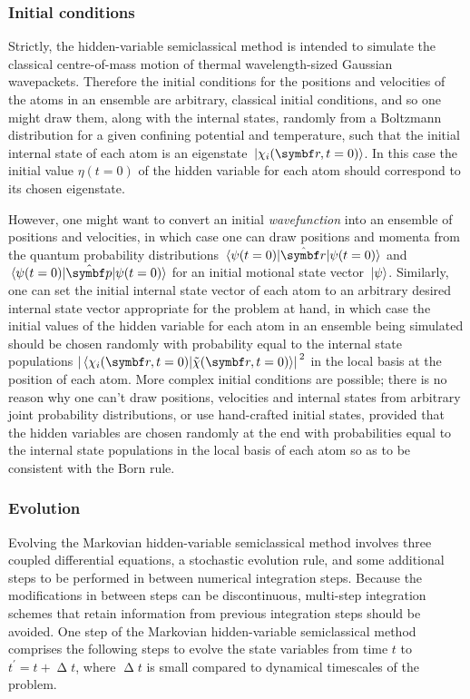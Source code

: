 \subsubsection{Initial conditions}

Strictly, the hidden-variable semiclassical method is intended to simulate the classical centre-of-mass motion of thermal wavelength-sized Gaussian wavepackets. Therefore the initial conditions for the positions and velocities of the atoms in an ensemble are arbitrary, classical initial conditions, and so one might draw them, along with the internal states, randomly from a Boltzmann distribution for a given confining potential and temperature, such that the initial internal state of each atom is an eigenstate $\ket{\chi_i(\vec r, t=0)}$. In this case the initial value $\eta(t=0)$ of the hidden variable for each atom should correspond to its chosen eigenstate.

However, one might want to convert an initial \emph{wavefunction} into an ensemble of positions and velocities, in which case one can draw positions and momenta from the quantum probability distributions $\matrixel{\psi(t=0)}{\hat{\vec r}}{\psi(t=0)}$ and $\matrixel{\psi(t=0)}{\hat{\vec p}}{\psi(t=0)}$ for an initial motional state vector $\ket{\psi}$.
Similarly, one can set the initial internal state vector of each atom to an arbitrary desired internal state vector appropriate for the problem at hand, in which case the initial values of the hidden variable for each atom in an ensemble being simulated should be chosen randomly with probability equal to the internal state populations $\abs{\braket{\chi_i(\vec r, t=0)}{\tilde\chi(\vec r, t=0)}}^2$ in the local basis at the position of each atom.
More complex initial conditions are possible; there is no reason why one can't draw positions, velocities and internal states from arbitrary joint probability distributions, or use hand-crafted initial states, provided that the hidden variables are chosen randomly at the end with probabilities equal to the internal state populations in the local basis of each atom so as to be consistent with the Born rule.

\subsubsection{Evolution}

Evolving the Markovian hidden-variable semiclassical method involves three coupled differential equations, a stochastic evolution rule, and some additional steps to be performed in between numerical integration steps. Because the modifications in between steps can be discontinuous, multi-step integration schemes that retain information from previous integration steps should be avoided. One step of the Markovian hidden-variable semiclassical method comprises the following steps to evolve the state variables from time $t$ to $t^\prime = t + \upDelta t$, where $\upDelta t$ is small compared to dynamical timescales of the problem.

